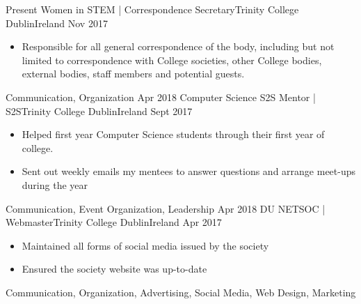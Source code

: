 
\begin{experiences}
\experience
    {Present} {Women in STEM | Correspondence Secretary}{Trinity College Dublin}{Ireland}
    {Nov 2017}    {
                      \begin{itemize}
                        \item Responsible for all general correspondence of the body, including but not limited to correspondence with College societies, other College bodies, external bodies, staff members and potential guests.                                       
                      \end{itemize}
                    }
                    {Communication, Organization}
  \emptySeparator 
  \experience
    {Apr 2018}   {Computer Science S2S Mentor | S2S}{Trinity College Dublin}{Ireland}
    {Sept 2017} {
                      \begin{itemize}
                        \item Helped first year Computer Science students through their first year of college. 
                        \item Sent out weekly emails my mentees to answer questions and arrange meet-ups during the year 
                      \end{itemize}
                    }
                    {Communication, Event Organization, Leadership}
  \emptySeparator
    \experience
    {Apr 2018} {DU NETSOC | Webmaster}{Trinity College Dublin}{Ireland}
    {Apr 2017}    {
                      \begin{itemize}
                        \item Maintained all forms of social media issued by the society 
                        \item Ensured the society website was up-to-date 
                      \end{itemize}
                    }
                    {Communication, Organization, Advertising, Social Media, Web Design, Marketing}
  \emptySeparator 
\end{experiences}
